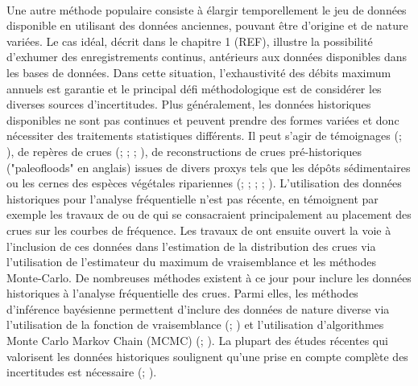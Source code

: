 \documentclass[11pt]{article}
\begin{document}
	\paragraph{} Une autre méthode populaire consiste à élargir temporellement le jeu de données disponible en utilisant des données anciennes, pouvant être d'origine et de nature variées. Le cas idéal, décrit dans le chapitre 1 (REF), illustre la possibilité d'exhumer des enregistrements continus, antérieurs aux données disponibles dans les bases de données. Dans cette situation, l'exhaustivité des débits maximum annuels est garantie et le principal défi méthodologique est de considérer les diverses sources d'incertitudes. Plus généralement, les données historiques disponibles ne sont pas continues et peuvent prendre des formes variées et donc nécessiter des traitements statistiques différents. Il peut s'agir de témoignages (\citet{pichard_les_1995}; \citet{kjeldsen_documentary_2014}), de repères de crues (\citet{parkes_defining_2016}; \citet{piotte_collection_2016}; \citet{engeland_new_2020}; \citet{medd_reperes_nodate}), de reconstructions de crues pré-historiques ("paleofloods" en anglais) issues de divers proxys tels que les dépôts sédimentaires ou les cernes des espèces végétales ripariennes (\citet{stedinger_flood_1986}; \citet{benito_use_2004}; \citet{dezileau_multidating_2014}; \citet{st_george_paleofloods_2020}; \citet{engeland_new_2020}). L'utilisation des données historiques pour l'analyse fréquentielle n'est pas récente, en témoignent par exemple les travaux de \citet{benson_use_1950} ou de \citet{hirsch_plotting_1987} qui se consacraient principalement au placement des crues sur les courbes de fréquence. Les travaux de \citet{stedinger_flood_1986} ont ensuite ouvert la voie à l'inclusion de ces données dans l'estimation de la distribution des crues via l'utilisation de l'estimateur du maximum de vraisemblance et les méthodes Monte-Carlo. De nombreuses méthodes existent à ce jour pour inclure les données historiques à l'analyse fréquentielle des crues. Parmi elles, les méthodes d'inférence bayésienne permettent d'inclure des données de nature diverse via l'utilisation de la fonction de vraisemblance (\citet{stedinger_flood_1986}; \citet{kuczera_comprehensive_1999}) et l'utilisation d'algorithmes Monte Carlo Markov Chain (MCMC) (\citet{reis_bayesian_2005}; \citet{renard_application_2006}). La plupart des études récentes qui valorisent les données historiques soulignent qu'une prise en compte complète des incertitudes est nécessaire (\citet{neppel_flood_2010}; \citet{parkes_defining_2016}).
	
\end{document}
